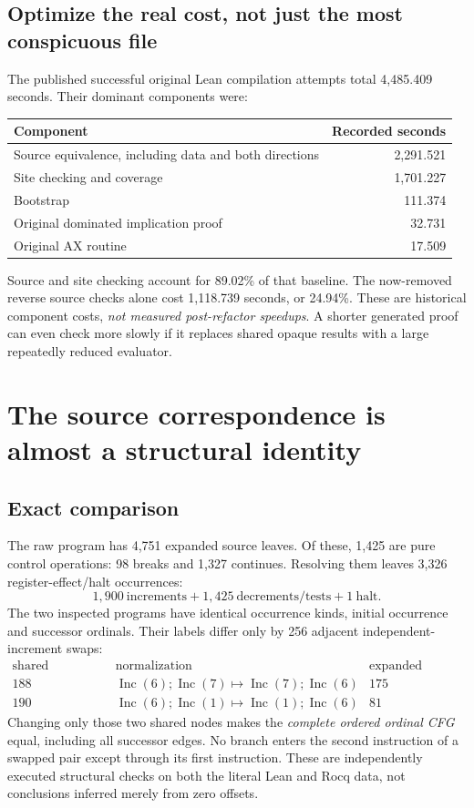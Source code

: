 \documentclass[11pt]{article}
\begin{document}
\subsection{Optimize the real cost, not just the most conspicuous file}
The published successful original Lean compilation attempts total 4,485.409 seconds. Their dominant components were:
\begin{center}
\begin{tabular}{lr}
\toprule
Component & Recorded seconds\\\midrule
Source equivalence, including data and both directions & 2,291.521\\
Site checking and coverage & 1,701.227\\
Bootstrap & 111.374\\
Original dominated implication proof & 32.731\\
Original AX routine & 17.509\\
\bottomrule
\end{tabular}
\end{center}
Source and site checking account for 89.02\% of that baseline. The now-removed reverse source checks alone cost 1,118.739 seconds, or 24.94\%. These are historical component costs, \emph{not measured post-refactor speedups}. A shorter generated proof can even check more slowly if it replaces shared opaque results with a large repeatedly reduced evaluator.

\section{The source correspondence is almost a structural identity}
\subsection{Exact comparison}
The raw program has 4,751 expanded source leaves. Of these, 1,425 are pure control operations: 98 breaks and 1,327 continues. Resolving them leaves 3,326 register-effect/halt occurrences:
\[
 1,900\ \text{increments}+1,425\ \text{decrements/tests}+1\ \text{halt}.
\]
The two inspected programs have identical occurrence kinds, initial occurrence and successor ordinals. Their labels differ only by 256 adjacent independent-increment swaps:
\[
\begin{array}{c|c|r}
\text{shared structured node}&\text{normalization}&\text{expanded occurrences}\\\hline
188&\operatorname{Inc}(6);\operatorname{Inc}(7)\mapsto
       \operatorname{Inc}(7);\operatorname{Inc}(6)&175\\
190&\operatorname{Inc}(6);\operatorname{Inc}(1)\mapsto
       \operatorname{Inc}(1);\operatorname{Inc}(6)&81
\end{array}
\]
Changing only those two shared nodes makes the \emph{complete ordered ordinal CFG} equal, including all successor edges. No branch enters the second instruction of a swapped pair except through its first instruction. These are independently executed structural checks on both the literal Lean and Rocq data, not conclusions inferred merely from zero offsets.
\end{document}
